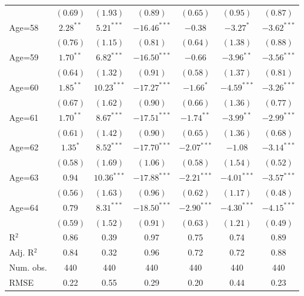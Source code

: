 \documentclass[fullpage]{paper}
\begin{document}
\begin{center}
\begin{longtable}{l c c c c c c }
            & $(0.69)$      & $(1.93)$      & $(0.89)$       & $(0.65)$      & $(0.95)$      & $(0.87)$      \\
Age=58      & $2.28^{**}$   & $5.21^{***}$  & $-16.46^{***}$ & $-0.38$       & $-3.27^{*}$   & $-3.62^{***}$ \\
            & $(0.76)$      & $(1.15)$      & $(0.81)$       & $(0.64)$      & $(1.38)$      & $(0.88)$      \\
Age=59      & $1.70^{**}$   & $6.82^{***}$  & $-16.50^{***}$ & $-0.66$       & $-3.96^{**}$  & $-3.56^{***}$ \\
            & $(0.64)$      & $(1.32)$      & $(0.91)$       & $(0.58)$      & $(1.37)$      & $(0.81)$      \\
Age=60      & $1.85^{**}$   & $10.23^{***}$ & $-17.27^{***}$ & $-1.66^{*}$   & $-4.59^{***}$ & $-3.26^{***}$ \\
            & $(0.67)$      & $(1.62)$      & $(0.90)$       & $(0.66)$      & $(1.36)$      & $(0.77)$      \\
Age=61      & $1.70^{**}$   & $8.67^{***}$  & $-17.51^{***}$ & $-1.74^{**}$  & $-3.99^{**}$  & $-2.99^{***}$ \\
            & $(0.61)$      & $(1.42)$      & $(0.90)$       & $(0.65)$      & $(1.36)$      & $(0.68)$      \\
Age=62      & $1.35^{*}$    & $8.52^{***}$  & $-17.70^{***}$ & $-2.07^{***}$ & $-1.08$       & $-3.14^{***}$ \\
            & $(0.58)$      & $(1.69)$      & $(1.06)$       & $(0.58)$      & $(1.54)$      & $(0.52)$      \\
Age=63      & $0.94$        & $10.36^{***}$ & $-17.88^{***}$ & $-2.21^{***}$ & $-4.01^{***}$ & $-3.57^{***}$ \\
            & $(0.56)$      & $(1.63)$      & $(0.96)$       & $(0.62)$      & $(1.17)$      & $(0.48)$      \\
Age=64      & $0.79$        & $8.31^{***}$  & $-18.50^{***}$ & $-2.90^{***}$ & $-4.30^{***}$ & $-4.15^{***}$ \\
            & $(0.59)$      & $(1.52)$      & $(0.91)$       & $(0.63)$      & $(1.21)$      & $(0.49)$      \\
\hline
R$^2$       & 0.86          & 0.39          & 0.97           & 0.75          & 0.74          & 0.89          \\
Adj. R$^2$  & 0.84          & 0.32          & 0.96           & 0.72          & 0.72          & 0.88          \\
Num. obs.   & 440           & 440           & 440            & 440           & 440           & 440           \\
RMSE        & 0.22          & 0.55          & 0.29           & 0.20          & 0.44          & 0.23          \\
\end{longtable}
\end{center}
\end{document}
